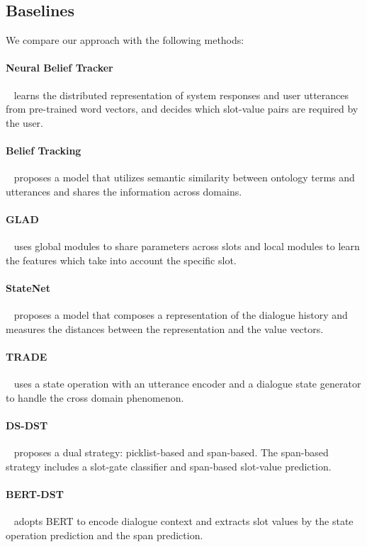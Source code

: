 \documentclass[11pt]{article}
\begin{document}
\subsection{Baselines}

We compare our approach with the following methods:
\paragraph{Neural Belief Tracker}~\citep{mrksic-etal-2017-neural} learns the distributed representation of system responses and user utterances from pre-trained word vectors, and decides which slot-value pairs are required by the user.
\paragraph{Belief Tracking}~\cite{ramadan-etal-2018-large} proposes a model that utilizes semantic similarity between ontology terms and utterances and shares the information across domains.
\paragraph{GLAD}~\citep{zhong-etal-2018-global} uses global modules to share parameters across slots and local modules to learn the features which take into account the specific slot.
\paragraph{StateNet}~\citep{ren-etal-2018-towards} proposes a model that composes a representation of the dialogue history and measures the distances between the representation and the value vectors.
\paragraph{TRADE}~\citep{wu-etal-2019-transferable} uses a state operation with an utterance encoder and a dialogue state generator to handle the cross domain phenomenon.
\paragraph{DS-DST}~\citep{zhang-etal-2020-find} proposes a dual strategy: picklist-based and span-based. The span-based strategy includes a slot-gate classifier and span-based slot-value prediction.
\paragraph{BERT-DST}~\citep{Chao2019} adopts BERT to encode dialogue context and extracts slot values by the state operation prediction and the span prediction.
\end{document}
